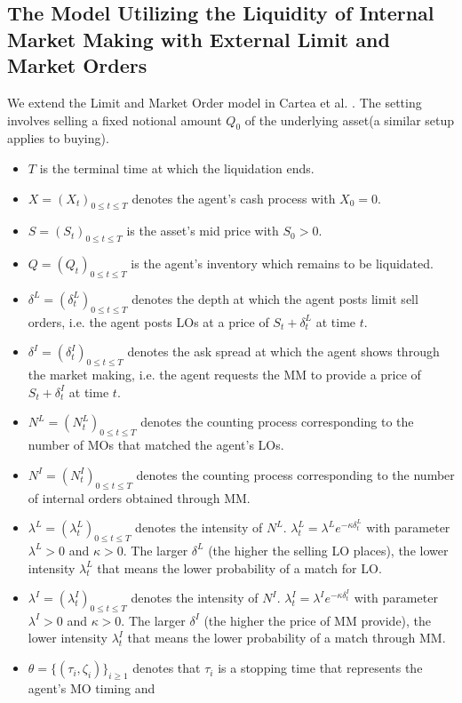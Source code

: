 \documentclass[12pt]{article}
\begin{document}
\subsection{The Model Utilizing the Liquidity of Internal Market Making 
with External Limit and Market Orders}
We extend the Limit and Market Order model in Cartea et al. \cite{cartea2015algorithmic}. 
The setting involves selling a fixed notional amount $Q_0$ of the underlying asset(a similar setup applies to buying).
\begin{itemize}
  \item $T$ is the terminal time at which the liquidation ends.
  \item $X = (X_t)_{0\le t \le T}$ denotes the agent's cash process with $X_0 = 0$.
  \item $S = (S_t)_{0\le t \le T}$ is the asset's mid price with $S_0 > 0.$
  \item $Q = (Q_t)_{0\le t \le T}$ is the agent's inventory which remains to be liquidated.
  \item $\delta^L = (\delta^L_t)_{0\le t \le T}$ denotes the depth at which the agent posts limit sell orders, i.e. 
  the agent posts LOs at a price of $S_t + \delta^L_t$ at time $t$.
  \item $\delta^I = (\delta^I_t)_{0\le t \le T}$ denotes the ask spread at which the agent shows through the market making, i.e. 
  the agent requests the MM to provide a price of $S_t + \delta^I_t$ at time $t$.
  \item $N^L = (N^L_t)_{0\le t \le T}$ denotes the counting process corresponding to the number of MOs that matched the agent's LOs.
  \item $N^I = (N^I_t)_{0\le t \le T}$ denotes the counting process corresponding to the number of internal orders obtained through MM.
  \item $\lambda^L = (\lambda^L_t)_{0\le t \le T}$ denotes the intensity of $N^L$. $\lambda^L_t = \lambda^L e^{-\kappa \delta^L_t}$ with parameter $\lambda^L > 0$ and $\kappa > 0$. 
  The larger $\delta^L$ (the higher the selling LO places), the lower intensity $\lambda^L_t$ that means the lower probability of a match for LO.
  \item $\lambda^I = (\lambda^I_t)_{0\le t \le T}$ denotes the intensity of $N^I$. $\lambda^I_t = \lambda^I e^{-\kappa \delta^I_t}$ with parameter $\lambda^I > 0$ and $\kappa > 0$.
  The larger $\delta^I$ (the higher the price of MM provide), the lower intensity $\lambda^I_t$ that means the lower probability of a match through MM.
  \item $\theta = \{(\tau_i, \zeta_i)\}_{i\ge 1}$ denotes that $\tau_i$ is a stopping time that represents the agent's MO timing and 

\end{itemize}
\end{document}
